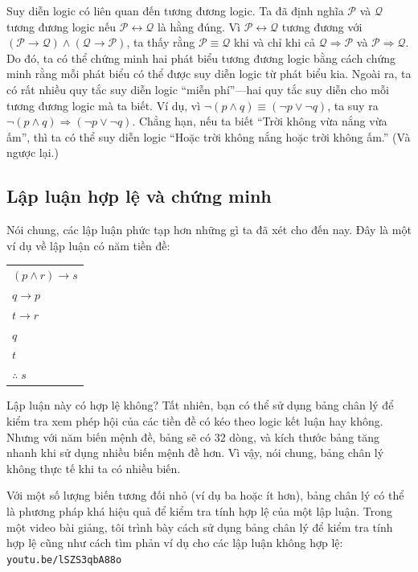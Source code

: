 Suy diễn logic có liên quan đến tương đương logic. Ta đã định nghĩa $\mathcal{P}$ và $\mathcal{Q}$ tương đương logic nếu $\mathcal{P} \leftrightarrow \mathcal{Q}$ là hằng đúng. Vì $\mathcal{P} \leftrightarrow \mathcal{Q}$ tương đương với $(\mathcal{P} \to \mathcal{Q}) \land (\mathcal{Q} \to \mathcal{P})$, ta thấy rằng $\mathcal{P} \equiv \mathcal{Q}$ khi và chỉ khi cả $\mathcal{Q} \Longrightarrow \mathcal{P}$ và $\mathcal{P} \Longrightarrow \mathcal{Q}$. Do đó, ta có thể chứng minh hai phát biểu tương đương logic bằng cách chứng minh rằng mỗi phát biểu có thể được suy diễn logic từ phát biểu kia. Ngoài ra, ta có rất nhiều quy tắc suy diễn logic ``miễn phí''---hai quy tắc suy diễn cho mỗi tương đương logic mà ta biết. Ví dụ, vì $\neg(p \land q) \equiv (\neg p \lor \neg q)$, ta suy ra $\neg(p \land q) \Longrightarrow (\neg p \lor \neg q)$. Chẳng hạn, nếu ta biết ``Trời không vừa nắng vừa ấm'', thì ta có thể suy diễn logic ``Hoặc trời không nắng hoặc trời không ấm.'' (Và ngược lại.)

\subsection{Lập luận hợp lệ và chứng minh}

Nói chung, các lập luận phức tạp hơn những gì ta đã xét cho đến nay. Đây là một ví dụ về lập luận có năm tiền đề:
\begin{center}
\begin{tabular}{l}
$(p \land r) \to s$ \\
$q \to p$ \\
$t \to r$ \\
$q$ \\
$t$ \\
\hline
$\therefore\; s$
\end{tabular}
\end{center}
Lập luận này có hợp lệ không? Tất nhiên, bạn có thể sử dụng bảng chân lý để kiểm tra xem phép hội của các tiền đề có kéo theo logic kết luận hay không. Nhưng với năm biến mệnh đề, bảng sẽ có 32 dòng, và kích thước bảng tăng nhanh khi sử dụng nhiều biến mệnh đề hơn. Vì vậy, nói chung, bảng chân lý không thực tế khi ta có nhiều biến.

\begin{notebox}
Với một số lượng biến tương đối nhỏ (ví dụ ba hoặc ít hơn), bảng chân lý có thể là phương pháp khá hiệu quả để kiểm tra tính hợp lệ của một lập luận. Trong một video bài giảng, tôi trình bày cách sử dụng bảng chân lý để kiểm tra tính hợp lệ cũng như cách tìm phản ví dụ cho các lập luận không hợp lệ: \texttt{youtu.be/lSZS3qbA88o}
\end{notebox}

